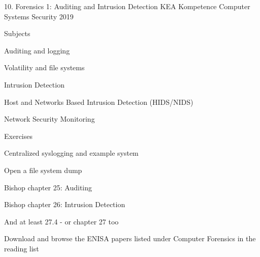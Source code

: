 \documentclass[Screen16to9,17pt]{foils}
\begin{document}
\mytitlepage
{10. Forensics 1: Auditing and Intrusion Detection}
{KEA Kompetence Computer Systems Security 2019}



\begin{list1}
\item Subjects
\begin{list2}
\item Auditing and logging
\item Volatility and file systems
\item Intrusion Detection
\item Host and Networks Based Intrusion Detection (HIDS/NIDS)
\item Network Security Monitoring
\end{list2}
\item Exercises
\begin{list2}
\item Centralized syslogging and example system
\item Open a file system dump
\end{list2}
\end{list1}




\begin{list1}
\item Bishop chapter 25: Auditing
\item Bishop chapter 26: Intrusion Detection
\item And at least 27.4 - or chapter 27 too
\item Download and browse the ENISA papers listed under Computer Forensics in the reading list

\end{list1}
















\slidenext
\end{document}
